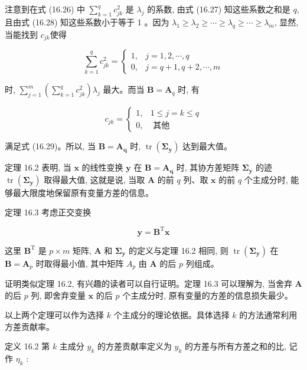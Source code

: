 \documentclass[10pt]{article}
\begin{document}
注意到在式 (16.26) 中 $\sum_{k=1}^{q} c_{j k}^{2}$ 是 $\lambda_{j}$ 的系数, 由式 (16.27) 知这些系数之和是 $q$, 且由式 (16.28) 知这些系数小于等于 1 。因为 $\lambda_{1} \geqslant \lambda_{2} \geqslant \cdots \geqslant \lambda_{q} \geqslant \cdots \geqslant \lambda_{m}$, 显然, 当能找到 $c_{j k}$使得

\[
\sum_{k=1}^{q} c_{j k}^{2}= \begin{cases}1, & j=1,2, \cdots, q  \tag{16.29}\\ 0, & j=q+1, q+2, \cdots, m\end{cases}
\]

时, $\sum_{j=1}^{m}\left(\sum_{k=1}^{q} c_{j k}^{2}\right) \lambda_{j}$ 最大。而当 $\boldsymbol{B}=\boldsymbol{A}_{q}$ 时, 有

$$
c_{j k}= \begin{cases}1, & 1 \leqslant j=k \leqslant q \\ 0, & \text { 其他 }\end{cases}
$$

满足式 (16.29)。所以, 当 $\boldsymbol{B}=\boldsymbol{A}_{\boldsymbol{q}}$ 时, $\operatorname{tr}\left(\boldsymbol{\Sigma}_{\boldsymbol{y}}\right)$ 达到最大值。

定理 16.2 表明, 当 $\boldsymbol{x}$ 的线性变换 $\boldsymbol{y}$ 在 $\boldsymbol{B}=\boldsymbol{A}_{\boldsymbol{q}}$ 时, 其协方差矩阵 $\boldsymbol{\Sigma}_{\boldsymbol{y}}$ 的迹 $\operatorname{tr}\left(\boldsymbol{\Sigma}_{\boldsymbol{y}}\right)$ 取得最大值, 这就是说, 当取 $\boldsymbol{A}$ 的前 $q$ 列、取 $\boldsymbol{x}$ 的前 $q$ 个主成分时, 能够最大限度地保留原有变量方差的信息。

定理 16.3 考虑正交变换

$$
\boldsymbol{y}=\boldsymbol{B}^{\mathrm{T}} \boldsymbol{x}
$$

这里 $\boldsymbol{B}^{\mathrm{T}}$ 是 $p \times m$ 矩阵, $\boldsymbol{A}$ 和 $\boldsymbol{\Sigma}_{\boldsymbol{y}}$ 的定义与定理 16.2 相同, 则 $\operatorname{tr}\left(\boldsymbol{\Sigma}_{\boldsymbol{y}}\right)$ 在 $\boldsymbol{B}=\boldsymbol{A}_{p}$ 时取得最小值, 其中矩阵 $A_{p}$ 由 $\boldsymbol{A}$ 的后 $p$ 列组成。

证明类似定理 16.2, 有兴趣的读者可以自行证明。定理 16.3 可以理解为, 当舍弃 $\boldsymbol{A}$ 的后 $p$ 列, 即舍弃变量 $\boldsymbol{x}$ 的后 $p$ 个主成分时, 原有变量的方差的信息损失最少。

以上两个定理可以作为选择 $k$ 个主成分的理论依据。具体选择 $k$ 的方法通常利用方差贡献率。

定义 16.2 第 $k$ 主成分 $y_{k}$ 的方差贡献率定义为 $y_{k}$ 的方差与所有方差之和的比, 记作 $\eta_{k}$ :
\end{document}
